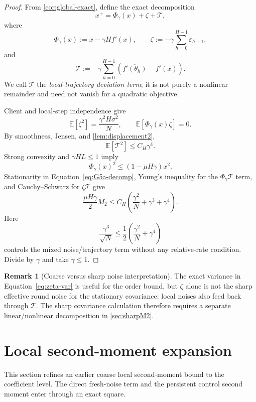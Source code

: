 \documentclass[11pt]{article}
\theoremstyle{definition}
\newtheorem{remark}[remark]{Remark}
\newcommand{\E}{\mathbb{E}}
\newcommand{\eps}{\varepsilon}
\begin{document}
\begin{proof}
From \cref{cor:global-exact}, define the exact decomposition
\begin{equation}
\label{eq:G5a-decomp}
  x^+=\Phi_\gamma(x)+\zeta+\mathcal{T},
\end{equation}
where
\[
  \Phi_\gamma(x):=x-\gamma H f'(x),\qquad
  \zeta:=-\gamma\sum_{h=0}^{H-1}\bar\eps_{h+1},
\]
and
\[
  \mathcal{T}:=-\gamma\sum_{h=0}^{H-1}
  \left(\overline{f'(\theta_h)}-f'(x)\right).
\]
We call $\mathcal{T}$ the \emph{local-trajectory deviation term}; it is not purely a nonlinear remainder and need not vanish for a quadratic objective.

Client and local-step independence give
\begin{equation}
\label{eq:zeta-var}
  \E[\zeta^2]=\frac{\gamma^2H\sigma^2}{N},
  \qquad
  \E[\Phi_\gamma(x)\zeta]=0.
\end{equation}
By smoothness, Jensen, and \cref{lem:displacement2},
\begin{equation}
\label{eq:T2}
  \E[\mathcal{T}^2]\le C_H\gamma^4.
\end{equation}
Strong convexity and $\gamma HL\le1$ imply
\[
  \Phi_\gamma(x)^2\le (1-\mu H\gamma)x^2.
\]
Stationarity in Equation~\eqref{eq:G5a-decomp}, Young's inequality for the $\Phi_\gamma\mathcal{T}$ term, and Cauchy--Schwarz for $\zeta\mathcal{T}$ give
\[
  \frac{\mu H\gamma}{2}M_2
  \le C_H\left(\frac{\gamma^2}{N}+\gamma^3+\gamma^4\right).
\]
Here
\[
  \frac{\gamma^3}{\sqrt N}
  \le \frac12\left(\frac{\gamma^2}{N}+\gamma^4\right)
\]
controls the mixed noise/trajectory term without any relative-rate condition. Divide by $\gamma$ and take $\gamma\le1$.
\end{proof}

\begin{remark}[Coarse versus sharp noise interpretation]
The exact variance in Equation~\eqref{eq:zeta-var} is useful for the order bound, but $\zeta$ alone is not the sharp effective round noise for the stationary covariance: local noises also feed back through $\mathcal{T}$. The sharp covariance calculation therefore requires a separate linear/nonlinear decomposition in \cref{sec:sharpM2}.
\end{remark}

\section{Local second-moment expansion}
\label{sec:G3}

This section refines an earlier coarse local second-moment bound to the coefficient level. The direct fresh-noise term and the persistent control second moment enter through an exact square.
\end{document}
